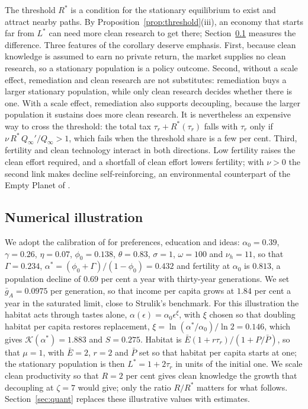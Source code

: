\documentclass[11pt]{article}
\begin{document}
The threshold $R^\ast$ is a condition for the stationary equilibrium to exist and attract nearby paths.
By Proposition~\ref{prop:threshold}(iii), an economy that starts far from $L^\ast$ can need more clean
research to get there; Section~\ref{sub:illustration} measures the difference. Three features of the corollary deserve emphasis. First, because clean knowledge is assumed to earn
no private return, the market supplies no clean research, so a stationary population is a policy outcome. Second, without a scale effect, remediation and clean
research are not substitutes: remediation buys a larger stationary population, while only clean research
decides whether there is one. With a scale effect, remediation also supports decoupling, because the
larger population it sustains does more clean research. It is nevertheless an expensive way to cross the
threshold: the total tax $\tau_r+R^\ast(\tau_r)$ falls with $\tau_r$ only if $\nu\,R^\ast\,Q_\infty'/Q_\infty>1$,
which fails when the threshold share is a few per cent. Third, fertility and clean technology interact in
both directions. Low fertility raises the clean effort required, and a shortfall of clean effort lowers
fertility; with $\nu>0$ the second link makes decline self-reinforcing, an environmental counterpart of
the Empty Planet of \citet{jones22}.

\subsection{Numerical illustration}
\label{sub:illustration}
\label{sec:calibration}
We adopt the calibration of \citet[Section~3.2]{STRULIK2024104943} for preferences, education and
ideas: $\alpha_0=0.39$, $\gamma=0.26$, $\eta=0.07$, $\phi_0=0.138$, $\theta=0.83$, $\sigma=1$, $\omega=100$
and $\nu_h=11$, so that $\Gamma=0.234$, $\alpha^\ast=(\phi_0+\Gamma)/(1-\phi_0)=0.432$ and fertility
at $\alpha_0$ is $0.813$, a population decline of $0.69$ per cent a year with thirty-year generations.
We set $\bar g_A=0.0975$ per generation, so that income per capita grows at $1.84$ per cent a year in the
saturated limit, close to Strulik's benchmark. For this illustration the habitat acts through tastes
alone, $\alpha(\epsilon)=\alpha_0\epsilon^{\xi}$, with $\xi$ chosen so that doubling habitat per capita
restores replacement, $\xi=\ln(\alpha^\ast/\alpha_0)/\ln2=0.146$, which gives
$\mathcal{K}(\alpha^\ast)=1.883$ and $S=0.275$. Habitat is $\bar E(1+r\tau_r)/(1+P/\bar P)$, so that
$\mu=1$, with $\bar E=2$, $r=2$ and $\bar P$ set so that habitat per capita starts at one; the stationary
population is then $L^\ast=1+2\tau_r$ in units of the initial one. We scale clean productivity so that
$R=2$ per cent gives clean knowledge the growth that decoupling at $\zeta=7$ would give; only the
ratio $R/R^\ast$ matters for what follows. Section~\ref{sec:quant} replaces these illustrative values with
estimates.
\end{document}

